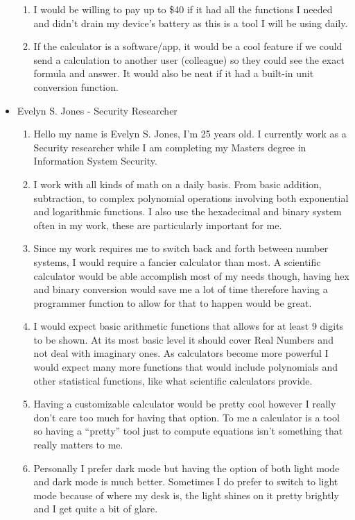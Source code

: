 \begin{itemize}
\begin{enumerate}
                        \item I would be willing to pay up to \$40 if it had all the functions I needed and didn’t drain my device's battery as this is a tool I will be using daily.
                        \item If the calculator is a software/app, it would be a cool feature if we could send a calculation to another user (colleague) so they could see the exact formula and answer. It would also be neat if it had a built-in unit conversion function.
                    \end{enumerate}
                \item Evelyn S. Jones - Security Researcher
                    \begin{enumerate}
                        \item Hello my name is Evelyn S. Jones, I’m 25 years old. I currently work as a Security researcher while I am completing my Masters degree in Information System Security.
                        \item I work with all kinds of math on a daily basis. From basic addition, subtraction, to complex polynomial operations involving both exponential and logarithmic functions. I also use the hexadecimal and binary system often in my work, these are particularly important for me.
                        \item Since my work requires me to switch back and forth between number systems, I would require a fancier calculator than most. A scientific calculator would be able accomplish most of my needs though, having hex and binary conversion would save me a lot of time therefore having a programmer function to allow for that to happen would be great.
                        \item I would expect basic arithmetic functions that allows for at least 9 digits to be shown. At its most basic level it should cover Real Numbers and not deal with imaginary ones. As calculators become more powerful I would expect many more functions that would include polynomials and other statistical functions, like what scientific calculators provide.
                        \item Having a customizable calculator would be pretty cool however I really don’t care too much for having that option. To me a calculator is a tool so having a “pretty” tool just to compute equations isn’t something that really matters to me.
                        \item Personally I prefer dark mode but having the option of both light mode and dark mode is much better. Sometimes I do prefer to switch to light mode because of where my desk is, the light shines on it pretty brightly and I get quite a bit of glare.

\end{enumerate}
\end{itemize}
